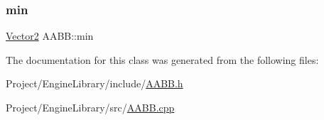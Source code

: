 \mbox{\label{class_a_a_b_b_a6e0ad742511375d51f29f84c599b411d}} 
\subsubsection{\texorpdfstring{min}{min}}
{\footnotesize\ttfamily \mbox{\hyperlink{struct_vector2}{Vector2}} A\+A\+B\+B\+::min}



The documentation for this class was generated from the following files\+:\begin{DoxyCompactItemize}
\item 
Project/\+Engine\+Library/include/\mbox{\hyperlink{_a_a_b_b_8h}{A\+A\+B\+B.\+h}}\item 
Project/\+Engine\+Library/src/\mbox{\hyperlink{_a_a_b_b_8cpp}{A\+A\+B\+B.\+cpp}}\end{DoxyCompactItemize}
